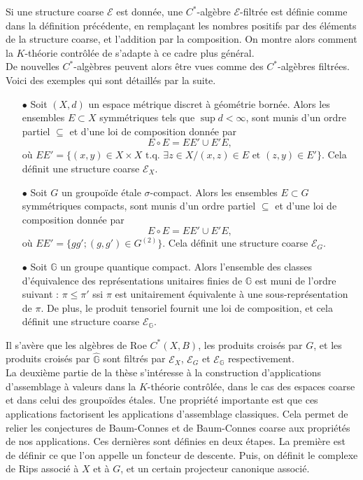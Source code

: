 Si une structure coarse $\mathcal E$ est donnée, une $C^*$-algèbre $\mathcal E$-filtrée est définie comme dans la définition précédente, en remplaçant les nombres positifs par des éléments de la structure coarse, et l'addition par la composition. On montre alors comment la $K$-théorie contrôlée de \cite{OY2} s'adapte à ce cadre plus général.\\

De nouvelles $C^*$-algèbres peuvent alors être vues comme des $C^*$-algèbres filtrées. Voici des exemples qui sont détaillés par la suite.
\begin{itemize} 
\item[$\bullet$] Soit $(X,d)$ un espace métrique discret à géométrie bornée. Alors les ensembles $E\subset X$ symmétriques tels que $\sup d<\infty$, sont munis d'un ordre partiel $\subseteq$ et d'une loi de composition donnée par 
\[E\circ E = EE'\cup E'E,\]
où $EE' = \{(x,y)\in X\times X \text{ t.q. }\exists z\in X / (x,z)\in E \text{ et }(z,y)\in E'\}$. Cela définit une structure coarse $\mathcal E_X$.
\item[$\bullet$] Soit $G$ un groupoïde étale $\sigma$-compact. Alors les ensembles $E\subset G$ symmétriques compacts, sont munis d'un ordre partiel $\subseteq$ et d'une loi de composition donnée par 
\[E\circ E = EE'\cup E'E,\]
où $EE' = \{gg' ; (g,g')\in G^{(2)}\}$. Cela définit une structure coarse $\mathcal E_G$.
\item[$\bullet$] Soit $\mathbb G$ un groupe quantique compact. Alors l'ensemble des classes d'équivalence des représentations unitaires finies de $\mathbb G$ est muni de l'ordre suivant : $\pi\leq \pi'$ ssi $\pi$ est unitairement équivalente à une sous-représentation de $\pi$. De plus, le produit tensoriel fournit une loi de composition, et cela définit une structure coarse $\mathcal E_{\mathbb G}$.\\
\end{itemize} 

Il s'avère que les algèbres de Roe $C^*(X,B)$, les produits croisés par $G$, et les produits croisés par $\hat{\mathbb G}$ sont filtrés par $\mathcal E_X$, $\mathcal E_G$ et $\mathcal E_{\mathbb G}$ respectivement.\\


La deuxième partie de la thèse s'intéresse à la construction d'applications d'assemblage à valeurs dans la $K$-théorie contrôlée, dans le cas des espaces coarse et dans celui des groupoïdes étales. Une propriété importante est que ces applications factorisent les applications d'assemblage classiques. Cela permet de relier les conjectures de Baum-Connes et de Baum-Connes coarse aux propriétés de nos applications. Ces dernières sont définies en deux étapes. La première est de définir ce que l'on appelle un foncteur de descente. Puis, on définit le complexe de Rips associé à $X$ et à $G$, et un certain projecteur canonique associé. \\

